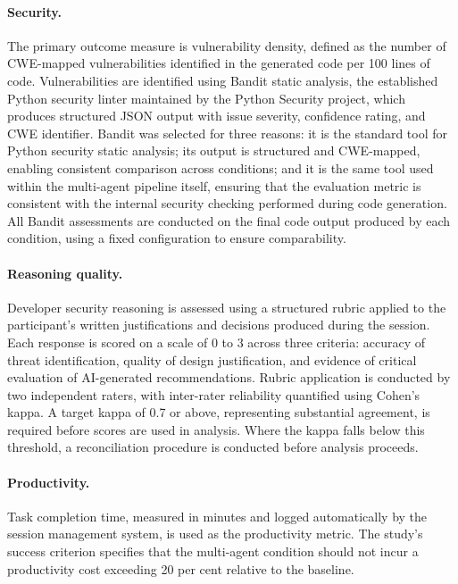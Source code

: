 \paragraph{Security.} The primary outcome measure is vulnerability density, defined as the number of CWE-mapped vulnerabilities identified in the generated code per 100 lines of code. Vulnerabilities are identified using Bandit static analysis, the established Python security linter maintained by the Python Security project, which produces structured JSON output with issue severity, confidence rating, and CWE identifier. Bandit was selected for three reasons: it is the standard tool for Python security static analysis; its output is structured and CWE-mapped, enabling consistent comparison across conditions; and it is the same tool used within the multi-agent pipeline itself, ensuring that the evaluation metric is consistent with the internal security checking performed during code generation. All Bandit assessments are conducted on the final code output produced by each condition, using a fixed configuration to ensure comparability.

\paragraph{Reasoning quality.} Developer security reasoning is assessed using a structured rubric applied to the participant's written justifications and decisions produced during the session. Each response is scored on a scale of 0 to 3 across three criteria: accuracy of threat identification, quality of design justification, and evidence of critical evaluation of AI-generated recommendations. Rubric application is conducted by two independent raters, with inter-rater reliability quantified using Cohen's kappa. A target kappa of 0.7 or above, representing substantial agreement, is required before scores are used in analysis. Where the kappa falls below this threshold, a reconciliation procedure is conducted before analysis proceeds.

\paragraph{Productivity.} Task completion time, measured in minutes and logged automatically by the session management system, is used as the productivity metric. The study's success criterion specifies that the multi-agent condition should not incur a productivity cost exceeding 20 per cent relative to the baseline.

